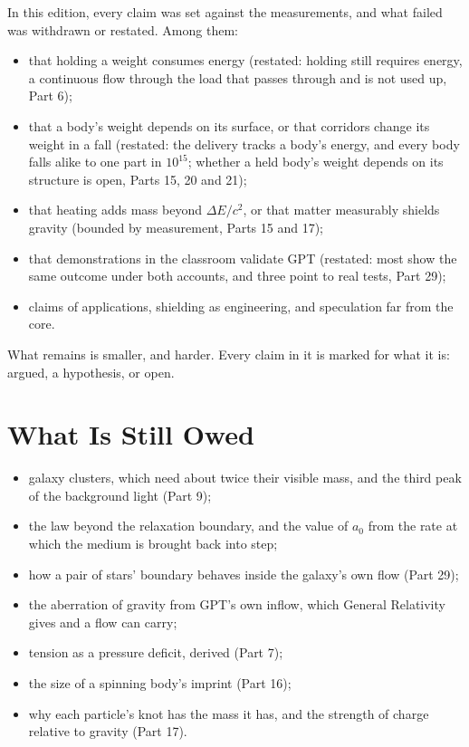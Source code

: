  In this edition, every claim was set against the measurements, and what failed was withdrawn or restated. Among them:
\begin{itemize}
\item that holding a weight consumes energy (restated: holding still requires energy, a continuous flow through the load that passes through and is not used up, Part 6);
\item that a body's weight depends on its surface, or that corridors change its weight in a fall (restated: the delivery tracks a body's energy, and every body falls alike to one part in $10^{15}$; whether a held body's weight depends on its structure is open, Parts 15, 20 and 21);
\item that heating adds mass beyond $\Delta E/c^2$, or that matter measurably shields gravity (bounded by measurement, Parts 15 and 17);
\item that demonstrations in the classroom validate GPT (restated: most show the same outcome under both accounts, and three point to real tests, Part 29);
\item claims of applications, shielding as engineering, and speculation far from the core.
\end{itemize}
What remains is smaller, and harder. Every claim in it is marked for what it is: argued, a hypothesis, or open.

\section{What Is Still Owed}

\begin{itemize}
\item galaxy clusters, which need about twice their visible mass, and the third peak of the background light (Part 9);
\item the law beyond the relaxation boundary, and the value of $a_0$ from the rate at which the medium is brought back into step;
\item how a pair of stars' boundary behaves inside the galaxy's own flow (Part 29);
\item the aberration of gravity from GPT's own inflow, which General Relativity gives and a flow can carry;
\item tension as a pressure deficit, derived (Part 7);
\item the size of a spinning body's imprint (Part 16);
\item why each particle's knot has the mass it has, and the strength of charge relative to gravity (Part 17).
\end{itemize}

